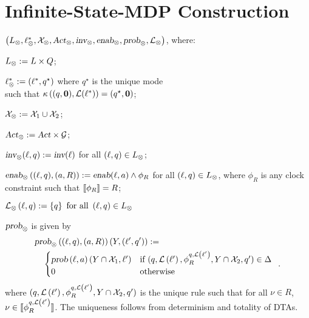 \section{Infinite-State-MDP Construction}
$\left({L}_\otimes, \ell^*_\otimes, \mathcal{X}_\otimes, \mbox{\sl Act}_\otimes, \mbox{\sl inv}_\otimes, \mbox{\sl enab}_\otimes,  \mbox{\sl prob}_\otimes, \mathcal{L}_\otimes\right)$, where:
\begin{compactitem}
\item $L_\otimes:=L\times Q$;
\item $\ell^*_\otimes:=(\ell^*, q^\star)$ where $q^\star$ is the unique mode\\
    such that $\kappa\left((q,\mathbf{0}), \mathcal{L}(\ell^*)\right)=(q^\star,\mathbf{0})$;
\item $\mathcal{X}_\otimes:=\mathcal{X}_1\cup\mathcal{X}_2$;
\item $\mbox{\sl Act}_\otimes:=\mbox{\sl Act}\times\mathcal{G}$; %
\item $\mbox{\sl inv}_\otimes(\ell,q):=\mbox{\sl inv}(\ell)$ for all $(\ell,q)\in L_\otimes$;
\item $\mbox{\sl enab}_\otimes\left((\ell,q), (a,R)\right):=\mbox{\sl enab}(\ell,a)\wedge \phi_R$ for all $(\ell,q)\in L_\otimes$, where $\phi_R$ is any clock constraint such that ${\llbracket}{\phi_R}{\rrbracket}=R$;
\item 
$
    \mathcal{L}_\otimes \left(
        \ell,q
    \right)
        := \left \{
            q
        \right \}
    \mbox{ for all } \left ( 
        \ell,q
    \right )
    \in L_\otimes
$
\item $\mbox{\sl prob}_\otimes$ is given by
\begin{align*}
&\prob_\otimes\left((\loc,\dtloc),(a,R)\right)(Y,(\loc',\dtloc')):=\\
&\quad\begin{cases}
\prob\left(\loc,a\right)(Y\cap \clocks_1,\loc') & \mbox{if } (\dtloc,\lbfunc\left(\loc'\right), \phi^{\dtloc,\lbfunc\left(\loc'\right)}_R, Y\cap \clocks_2, \dtloc')\in\rules\\%
0 & \mbox{otherwise}
\end{cases}\enskip.
\end{align*}
where $(q,\mathcal{L}\left(\ell'\right), \phi^{q,\mathcal{L}\left(\ell'\right)}_R, Y\cap \mathcal{X}_2, q')$ is the unique rule such that for all $\nu\in R$, $\nu\in{\llbracket}{\phi^{q,\mathcal{L}\left(\ell'\right)}_R}{\rrbracket}$.
The uniqueness follows from determinism and totality of DTAs.
\end{compactitem}


